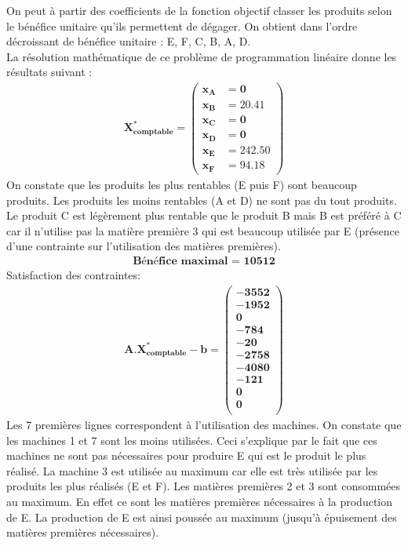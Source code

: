 \documentclass[12pt]{article}
\begin{document}
On peut à partir des coefficients de la fonction objectif classer les produits selon le bénéfice unitaire qu'ils permettent de dégager. On obtient dans l'ordre décroissant de bénéfice unitaire : E, F, C, B, A, D.\\
La résolution mathématique de ce problème de programmation linéaire donne les résultats suivant :
\begin{align*} 
	\boldsymbol{X^{*}_{comptable} = 
   \left (
   \begin{aligned}
      x_{A} &= 0 \\
      x_{B} &= 20.41 \\
      x_{C} &= 0 \\
      x_{D} &= 0 \\
      x_{E} &= 242.50 \\
      x_{F} &= 94.18 
   \end{aligned}
   \right )
 }
\end{align*}
On constate que les produits les plus rentables (E puis F) sont beaucoup produits. Les produits
les moins rentables (A et D) ne sont pas du tout produits. Le produit C est légèrement plus rentable que le produit B mais B est préféré à C car il n'utilise pas la matière première 3 qui est beaucoup utilisée par E (présence d'une contrainte sur l'utilisation des matières premières).
\begin{align*}
\textbf{Bénéfice maximal = 10512}
\end{align*}
Satisfaction des contraintes: 
\begin{align*} 
	\boldsymbol{A.X^{*}_{comptable} - b = 
   \left (
   \begin{aligned}
      -3552 \\
      -1952 \\
      0 \\
      -784 \\
      -20 \\
      -2758 \\
      -4080 \\
      -121 \\
      0 \\
      0\\
   \end{aligned}
   \right )}
\end{align*}
Les 7 premières lignes correspondent à l'utilisation des machines. On constate que les
machines 1 et 7 sont les moins utilisées. Ceci s'explique par le fait que ces machines ne sont
pas nécessaires pour produire E qui est le produit le plus réalisé. La machine 3 est utilisée au maximum car elle est très utilisée par les produits les plus réalisés (E et F). Les matières premières 2 et 3 sont consommées au maximum. En effet ce sont les matières premières nécessaires à la production de E. La production de E est ainsi poussée au maximum (jusqu'à épuisement des matières premières nécessaires).
\end{document}
